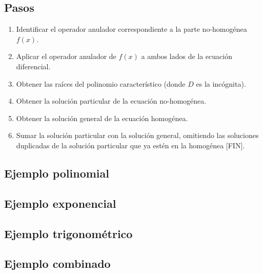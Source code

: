 \documentclass{report}
\begin{document}
\subsection{Pasos}

\begin{enumerate}
    \item Identificar el operador anulador correspondiente a la parte no-homogénea $f(x)$.

    \item Aplicar el operador anulador de $f(x)$ a ambos lados de la ecuación diferencial.

    \item Obtener las raíces del polinomio característico (donde $D$ es la incógnita).

    \item Obtener la solución particular de la ecuación no-homogénea.

    \item Obtener la solución general de la ecuación homogénea.


    \item Sumar la solución particular con la solución general, omitiendo las soluciones duplicadas de la solución particular que ya estén en la homogénea [FIN].
\end{enumerate}


\subsection{Ejemplo polinomial}

\subsection{Ejemplo exponencial}

\subsection{Ejemplo trigonométrico}

\subsection{Ejemplo combinado}
\end{document}
